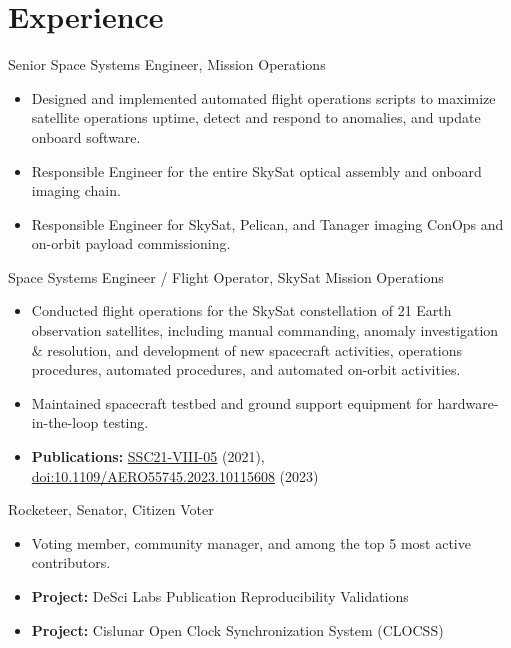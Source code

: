 \documentclass[10pt,final,sans]{resume}
\begin{document}
\section{Experience}

Senior Space Systems Engineer, Mission Operations
\begin{itemize}
    \item Designed and implemented automated flight operations scripts to maximize satellite operations uptime, detect and respond to anomalies, and update onboard software.
    \item Responsible Engineer for the entire SkySat optical assembly and onboard imaging chain.
    \item Responsible Engineer for SkySat, Pelican, and Tanager imaging ConOps and on-orbit payload commissioning.
\end{itemize}

Space Systems Engineer / Flight Operator, SkySat Mission Operations
\begin{itemize}
    \item Conducted flight operations for the SkySat constellation of 21 Earth
    observation satellites, including manual commanding, anomaly investigation \&
    resolution, and development of new spacecraft activities, operations
    procedures, automated procedures, and automated on-orbit activities.
    \item Maintained spacecraft testbed and ground support equipment for
    hardware-in-the-loop testing.
    \item {\bf Publications:} \href{https://digitalcommons.usu.edu/smallsat/2021/all2021/189/}{SSC21-VIII-05} (2021), \href{https://doi.org/10.1109/AERO55745.2023.10115608}{doi:10.1109/AERO55745.2023.10115608} (2023)
\end{itemize}

Rocketeer, Senator, Citizen Voter
\begin{itemize}
    \item Voting member, community manager, and among the top 5 most active contributors.
    \item {\bf Project:} DeSci Labs Publication Reproducibility Validations
    \item {\bf Project:} Cislunar Open Clock Synchronization System (CLOCSS)
\end{itemize}
\end{document}
